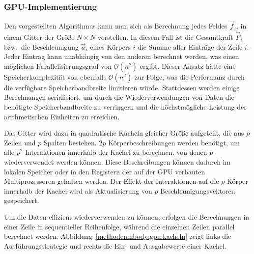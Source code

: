 \subsubsection{GPU-Implementierung}
\label{methoden:nbody:gpu}

Den vorgestellten Algorithmus kann man sich als Berechnung jedes Feldes
$\vec{f}_{ij}$ in einem Gitter der Größe $N \times N$ vorstellen. In diesem Fall
ist die Gesamtkraft $\vec{F}_i$ bzw.\ die Beschleunigung $\vec{a}_i$ eines
Körpers $i$ die Summe aller Einträge der Zeile $i$. Jeder Eintrag kann
unabhängig von den anderen berechnet werden, was einen möglichen
Parallelisierungsgrad von $\mathcal{O}(n^2)$ ergibt. Dieser Ansatz hätte eine
Speicherkomplexität von ebenfalls $\mathcal{O}(n^2)$ zur Folge, was die
Performanz durch die verfügbare Speicherbandbreite limitieren würde. Stattdessen
werden einige Berechnungen serialisiert, um durch die Wiederverwendungen von
Daten die benötigte Speicherbandbreite zu verringern und die höchstmögliche
Leistung der arithmetischen Einheiten zu erreichen.

Das Gitter wird dazu in quadratische Kacheln gleicher Größe aufgeteilt, die aus
$p$ Zeilen und $p$ Spalten bestehen. $2p$ Körperbeschreibungen werden benötigt,
um alle $p^2$ Interaktionen innerhalb der Kachel zu berechnen, von denen $p$
wiederverwendet werden können. Diese Beschreibungen können dadurch im lokalen
Speicher oder in den Registern der auf der GPU verbauten Multiprozessoren
gehalten werden. Der Effekt der Interaktionen auf die $p$ Körper innerhalb der
Kachel wird als Aktualisierung von $p$ Beschleunigungsvektoren gespeichert.

Um die Daten effizient wiederverwenden zu können, erfolgen die Berechnungen
in einer Zeile in sequentieller Reihenfolge, während die einzelnen Zeilen
parallel berechnet werden. Abbildung~\ref{methoden:nbody:gpu:kacheln} zeigt
links die Ausführungsstrategie und rechts die Ein- und Ausgabewerte einer
Kachel.


